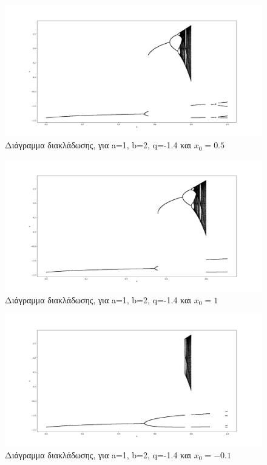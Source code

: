 \begin{figure}[h!]
	\centering
	\includegraphics[width=0.8\linewidth]{LateX images/graphs q14/g2}
	\caption{ Διάγραμμα διακλάδωσης, για a=1, b=2, q=-1.4 και \(x_0=0.5\)}
	\label{f:g20}
\end{figure}
\begin{figure}[h!]
	\centering
	\includegraphics[width=0.8\linewidth]{LateX images/graphs q14/g3}
	\caption{ Διάγραμμα διακλάδωσης, για a=1, b=2, q=-1.4 και \(x_0=1\)}
	\label{f:g21}
\end{figure}
\begin{figure}[h!]
	\centering
	\includegraphics[width=0.8\linewidth]{LateX images/graphs q14/g5}
	\caption{ Διάγραμμα διακλάδωσης, για a=1, b=2, q=-1.4 και \(x_0=-0.1\)}
	\label{f:g22}
\end{figure}

